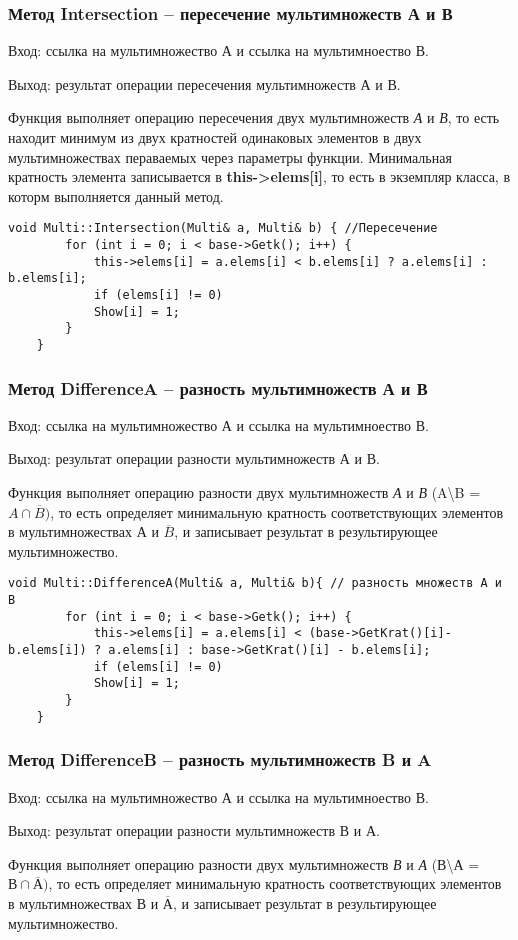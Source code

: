 \documentclass[10pt,a4paper,final]{article} %
\begin{document}
\subsubsection {Метод Intersection -- пересечение мультимножеств А и В}
\par Вход: ссылка на мультимножество А и ссылка на мультимноество В. 
\par Выход: результат операции пересечения мультимножеств А и В.
\par Функция выполняет операцию пересечения двух мультимножеств \textit{А} и \textit{В}, то есть находит минимум из двух кратностей одинаковых элементов в двух мультимножествах пераваемых через параметры функции. Минимальная кратность элемента записывается в \textbf{this->elems[i]}, то есть в экземпляр класса, в которм выполняется данный метод.

\begin{lstlisting}[caption={Метод Intersection}]
	void Multi::Intersection(Multi& a, Multi& b) { //Пересечение 
		for (int i = 0; i < base->Getk(); i++) {
			this->elems[i] = a.elems[i] < b.elems[i] ? a.elems[i] : b.elems[i];
			if (elems[i] != 0)
			Show[i] = 1;
		}
	}
\end{lstlisting}


\subsubsection {Метод DifferenceA -- разность мультимножеств А и В}
\par Вход: ссылка на мультимножество А и ссылка на мультимноество В. 
\par Выход: результат операции разности мультимножеств А и В.
\par Функция выполняет операцию разности двух мультимножеств \textit{А} и \textit{В} (A\textbackslash B = $A \cap \overline{B})$, то есть определяет минимальную кратность соответствующих элементов в мультимножествах А и $\overline{B}$, и записывает результат в результирующее мультимножество.

\begin{lstlisting}[caption={Метод DifferenceA}]
	void Multi::DifferenceA(Multi& a, Multi& b){ // разность множеств A и B
		for (int i = 0; i < base->Getk(); i++) {
			this->elems[i] = a.elems[i] < (base->GetKrat()[i]-b.elems[i]) ? a.elems[i] : base->GetKrat()[i] - b.elems[i];
			if (elems[i] != 0)
			Show[i] = 1;
		}
	}
\end{lstlisting}


\subsubsection {Метод DifferenceB --  разность мультимножеств B и A}
\par Вход: ссылка на мультимножество А и ссылка на мультимноество В. 
\par Выход: результат операции разности мультимножеств В и А.
\par Функция выполняет операцию разности двух мультимножеств \textit{В} и \textit{А} (В\textbackslash А = $В \cap \overline{А})$, то есть определяет минимальную кратность соответствующих элементов в мультимножествах В и $\overline{А}$, и записывает результат в результирующее мультимножество.
\end{document}
